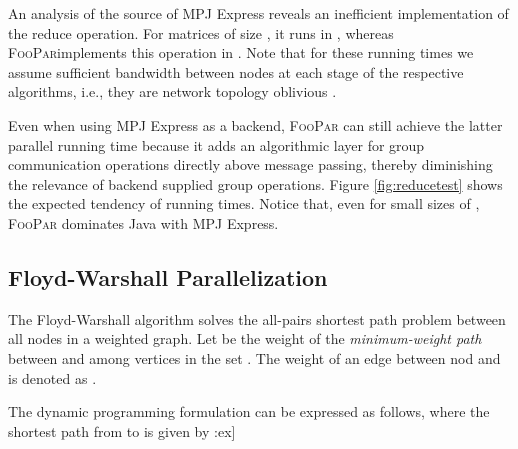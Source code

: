 \documentclass{article}
\newcommand{\framework}{{\rmfamily\scshape FooPar}\xspace}
\begin{document}
{\begin{algorithm}
{\sloppy
An analysis of the source of MPJ Express reveals an inefficient implementation of the reduce
operation. For matrices of size , it runs in , whereas
\framework \linebreak implements this operation in  . Note that for these running times we assume sufficient bandwidth between
nodes at each stage of the respective algorithms, i.e., they are network
topology oblivious \cite{grama}.

Even when using MPJ Express as a backend,
\framework can still achieve the latter parallel running time because it adds an
algorithmic layer for group communication operations directly above message
passing, thereby diminishing the relevance of backend supplied group
operations. 
Figure \ref{fig:reducetest} shows the expected tendency of running times. Notice
that, even for small sizes of , \framework dominates Java with MPJ Express.

\subsection{Floyd-Warshall Parallelization}
\label{sec:floyd}
The Floyd-Warshall algorithm solves the all-pairs shortest path problem between
all nodes  in a weighted graph. Let  be the weight
of the \textit{minimum-weight path} between  and  among vertices in
the set . The weight of an edge between nod  and  is denoted as .

The dynamic programming formulation can be
expressed as follows, where the shortest path from  to  is given by :\2ex]

\begin{figure}
\begin{center}
\end{center}
\end{figure}}
\end{algorithm}}
\end{document}
